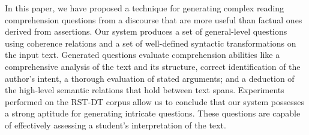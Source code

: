 In this paper, we have proposed a technique for generating complex reading comprehension questions from a discourse that are more useful than factual ones derived from assertions. Our system produces a set of general-level questions using coherence relations and a set of well-defined syntactic transformations on the input text. Generated questions evaluate comprehension abilities like a comprehensive analysis of the text and its structure, correct identification of the author's intent, a thorough evaluation of stated arguments; and a deduction of the high-level semantic relations that hold between text spans. Experiments performed on the RST-DT corpus allow us to conclude that our system possesses a strong aptitude for generating intricate questions. These questions are capable of effectively assessing a student's interpretation of the text.

